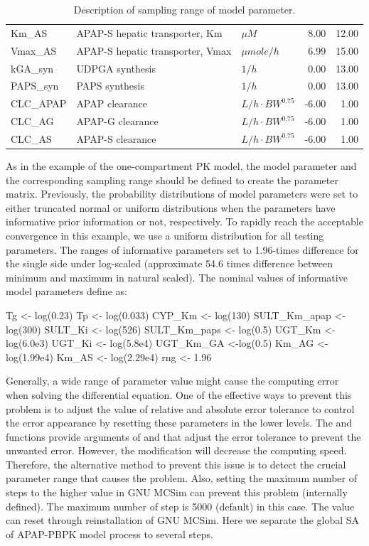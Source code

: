 \begin{table}[ht]
\begin{tabular}{lllrr}
  Km\_AS & APAP-S hepatic transporter, Km & $\mu{M}$ & 8.00 & 12.00 \\ 
  Vmax\_AS & APAP-S hepatic transporter, Vmax & $\mu{mole}/h$ & 6.99 & 15.00 \\ 
  kGA\_syn & UDPGA synthesis & $1/h$ & 0.00 & 13.00 \\ 
  PAPS\_syn & PAPS synthesis & $1/h$ & 0.00 & 13.00 \\ 
  CLC\_APAP & APAP clearance & $L/h\cdot{BW}^{0.75}$ & -6.00 & 1.00 \\ 
  CLC\_AG & APAP-G clearance & $L/h\cdot{BW}^{0.75}$ & -6.00 & 1.00 \\ 
  CLC\_AS & APAP-S clearance & $L/h\cdot{BW}^{0.75}$ & -6.00 & 1.00 \\ 
   \hline
\end{tabular}
\endgroup
\caption{\label{tab:data}Description of sampling range of model parameter.} 
\end{table}

As in the example of the one-compartment PK model, the model parameter
and the corresponding sampling range should be defined to create the
parameter matrix. Previously, the probability distributions of model
parameters were set to either truncated normal or uniform distributions
when the parameters have informative prior information or not,
respectively. To rapidly reach the acceptable convergence in this
example, we use a uniform distribution for all testing parameters. The
ranges of informative parameters set to 1.96-times difference for the
single side under log-scaled (approximate 54.6 times difference between
minimum and maximum in natural scaled). The nominal values of
informative model parameters define as:

\begin{Schunk}
\begin{Sinput}
Tg <- log(0.23)
Tp <- log(0.033)
CYP_Km <- log(130)
SULT_Km_apap <- log(300)
SULT_Ki <- log(526)
SULT_Km_paps <- log(0.5)
UGT_Km <- log(6.0e3)
UGT_Ki <- log(5.8e4)
UGT_Km_GA <-log(0.5)
Km_AG <- log(1.99e4)
Km_AS <- log(2.29e4)
rng <- 1.96 
\end{Sinput}
\end{Schunk}

Generally, a wide range of parameter value might cause the computing
error when solving the differential equation. One of the effective ways
to prevent this problem is to adjust the value of relative and absolute
error tolerance to control the error appearance by resetting these
parameters in the lower levels. The  and
 functions provide arguments of  and
 that adjust the error tolerance to prevent the unwanted
error. However, the modification will decrease the computing speed.
Therefore, the alternative method to prevent this issue is to detect the
crucial parameter range that causes the problem. Also, setting the
maximum number of steps to the higher value in GNU MCSim can prevent
this problem (internally defined). The maximum number of step is 5000
(default) in this case. The value can reset through reinstallation of
GNU MCSim. Here we separate the global SA of APAP-PBPK model process to
several steps.

